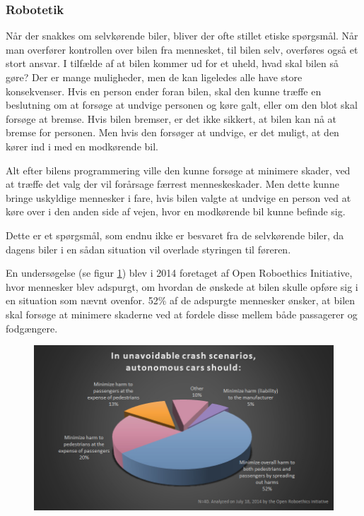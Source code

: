 \subsubsection{Robotetik}
	Når der snakkes om selvkørende biler, bliver der ofte stillet etiske spørgsmål. Når man overfører kontrollen over bilen fra mennesket, til bilen selv, overføres også et stort ansvar. I tilfælde af at bilen kommer ud for et uheld, hvad skal bilen så gøre? Der er mange muligheder, men de kan ligeledes alle have store konsekvenser. Hvis en person ender foran bilen, skal den kunne træffe en beslutning om at forsøge at undvige personen og køre galt, eller om den blot skal forsøge at bremse. Hvis bilen bremser, er det ikke sikkert, at bilen kan nå at bremse for personen. Men hvis den forsøger at undvige, er det muligt, at den kører ind i med en modkørende bil. 

	Alt efter bilens programmering ville den kunne forsøge at minimere skader, ved at træffe det valg der vil forårsage færrest menneskeskader. Men dette kunne bringe uskyldige mennesker i fare, hvis bilen valgte at undvige en person ved at køre over i den anden side af vejen, hvor en modkørende bil kunne befinde sig. 
	
	Dette er et spørgsmål, som endnu ikke er besvaret fra de selvkørende biler, da dagens biler i en sådan situation vil overlade styringen til føreren. 

	En undersøgelse (se figur \ref{fig:etik_accident}) blev i 2014 foretaget af Open Roboethics Initiative, hvor mennesker blev adspurgt, om hvordan de ønskede at bilen skulle opføre sig i en situation som nævnt ovenfor. 52\% af de adspurgte mennesker ønsker, at bilen skal forsøge at minimere skaderne ved at fordele disse mellem både passagerer og fodgængere. 
	

	\begin{figure}[h!]
		\centering
		\includegraphics[width=\textwidth]{images/roboethics-2.jpg}
		\label{fig:etik_accident}
	\end{figure}

